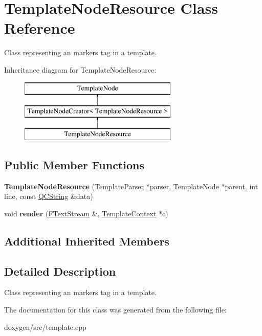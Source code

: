 \hypertarget{class_template_node_resource}{}\section{Template\+Node\+Resource Class Reference}
\label{class_template_node_resource}


Class representing an \textquotesingle{}markers\textquotesingle{} tag in a template.  


Inheritance diagram for Template\+Node\+Resource\+:\begin{figure}[H]
\begin{center}
\leavevmode
\includegraphics[height=3.000000cm]{class_template_node_resource}
\end{center}
\end{figure}
\subsection*{Public Member Functions}
\begin{DoxyCompactItemize}
\item 
\mbox{\label{class_template_node_resource_ab4b340ee844ed38c081dfedd825b1b46}} 
{\bfseries Template\+Node\+Resource} (\mbox{\hyperlink{class_template_parser}{Template\+Parser}} $\ast$parser, \mbox{\hyperlink{class_template_node}{Template\+Node}} $\ast$parent, int line, const \mbox{\hyperlink{class_q_c_string}{Q\+C\+String}} \&data)
\item 
\mbox{\label{class_template_node_resource_a94b14f701199ae76e5a6c574e34c5591}} 
void {\bfseries render} (\mbox{\hyperlink{class_f_text_stream}{F\+Text\+Stream}} \&, \mbox{\hyperlink{class_template_context}{Template\+Context}} $\ast$c)
\end{DoxyCompactItemize}
\subsection*{Additional Inherited Members}


\subsection{Detailed Description}
Class representing an \textquotesingle{}markers\textquotesingle{} tag in a template. 

The documentation for this class was generated from the following file\+:\begin{DoxyCompactItemize}
\item 
doxygen/src/template.\+cpp\end{DoxyCompactItemize}
